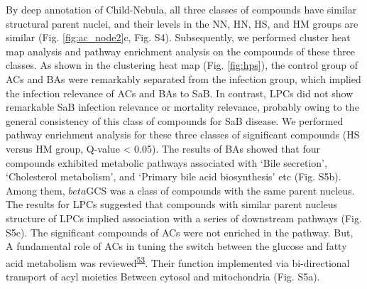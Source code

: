 \documentclass[
]{article}
\begin{document}
By deep annotation of Child-Nebula, all three classes of compounds have
similar structural parent nuclei, and their levels in the NN, HN, HS,
and HM groups are similar (Fig. \ref{fig:ac_node2}c, Fig. S4).
Subsequently, we performed cluster heat map analysis and pathway
enrichment analysis on the compounds of these three classes. As shown in
the clustering heat map (Fig. \ref{fig:hps}), the control group of ACs
and BAs were remarkably separated from the infection group, which
implied the infection relevance of ACs and BAs to SaB. In contrast, LPCs
did not show remarkable SaB infection relevance or mortality relevance,
probably owing to the general consistency of this class of compounds for
SaB disease. We performed pathway enrichment analysis for these three
classes of significant compounds (HS versus HM group, Q-value
\textless{} 0.05). The results of BAs showed that four compounds
exhibited metabolic pathways associated with `Bile secretion',
`Cholesterol metabolism', and `Primary bile acid biosynthesis' etc (Fig.
S5b). Among them, \(beta\)GCS was a class of compounds with the same
parent nucleus. The results for LPCs suggested that compounds with
similar parent nucleus structure of LPCs implied association with a
series of downstream pathways (Fig. S5c). The significant compounds of
ACs were not enriched in the pathway. But, A fundamental role of ACs in
tuning the switch between the glucose and fatty acid metabolism was
reviewed\textsuperscript{\protect\hyperlink{ref-2018bi}{53}}. Their
function implemented via bi-directional transport of acyl moieties
Between cytosol and mitochondria (Fig. S5a).
\end{document}

